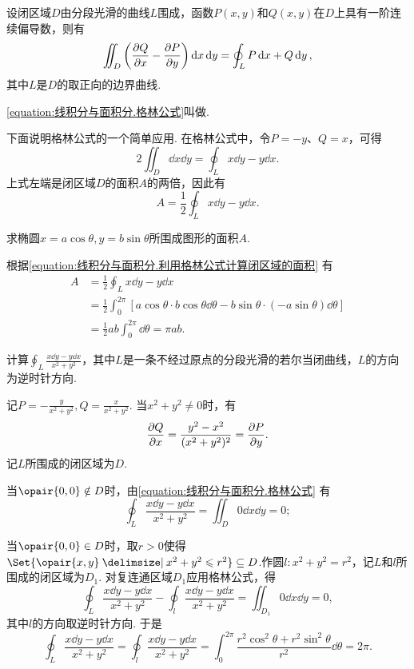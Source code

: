 \begin{theorem}[格林公式]
设闭区域\(D\)由分段光滑的曲线\(L\)围成，函数\(P(x,y)\)和\(Q(x,y)\)在\(D\)上具有一阶连续偏导数，则有
\begin{equation}\label{equation:线积分与面积分.格林公式}
\iint_D \left( \pdv{Q}{x} - \pdv{P}{y} \right) \dd{x}\dd{y}
= \oint_L P\dd{x} + Q\dd{y},
\end{equation}其中\(L\)是\(D\)的取正向的边界曲线.
\end{theorem}
\cref{equation:线积分与面积分.格林公式}叫做.

下面说明格林公式的一个简单应用.
在格林公式中，令\(P=-y\)、\(Q=x\)，可得\[
2 \iint_D \dd{x}\dd{y}
=\oint_L x\dd{y}-y\dd{x}.
\]上式左端是闭区域\(D\)的面积\(A\)的两倍，因此有
\begin{equation}\label{equation:线积分与面积分.利用格林公式计算闭区域的面积}
A = \frac{1}{2} \oint_L x\dd{y}-y\dd{x}.
\end{equation}
\begin{example}
求椭圆\(x = a \cos\theta, y = b \sin\theta\)所围成图形的面积\(A\).
\begin{solution}
根据\cref{equation:线积分与面积分.利用格林公式计算闭区域的面积} 有\begin{align*}
A &= \frac{1}{2} \oint_L x\dd{y}-y\dd{x} \\
&= \frac{1}{2} \int_0^{2\pi} \left[ a \cos\theta \cdot b \cos\theta \dd{\theta}
	- b \sin\theta \cdot (-a \sin\theta) \dd{\theta} \right] \\
&= \frac{1}{2} ab \int_0^{2\pi} \dd{\theta}
= \pi ab.
\end{align*}
\end{solution}
\end{example}

\begin{example}
计算\(\oint_L \frac{x\dd{y}-y\dd{x}}{x^2+y^2}\)，其中\(L\)是一条不经过原点的分段光滑的若尔当闭曲线，\(L\)的方向为逆时针方向.
\begin{solution}
记\(P = -\frac{y}{x^2+y^2}, Q = \frac{x}{x^2+y^2}\).
当\(x^2+y^2\neq0\)时，有\[
\pdv{Q}{x} = \frac{y^2-x^2}{(x^2+y^2)^2} = \pdv{P}{y}.
\]记\(L\)所围成的闭区域为\(D\).

当\(\opair{0,0} \notin D\)时，由\cref{equation:线积分与面积分.格林公式} 有\[
\oint_L \frac{x\dd{y}-y\dd{x}}{x^2+y^2} = \iint_D 0 \dd{x}\dd{y} = 0;
\]

当\(\opair{0,0} \in D\)时，取\(r>0\)使得\(\Set{ \opair{x,y} \given x^2+y^2 \leqslant r^2 } \subseteq D\).作圆\(l: x^2+y^2=r^2\)，记\(L\)和\(l\)所围成的闭区域为\(D_1\).
对复连通区域\(D_1\)应用格林公式，得\[
\oint_L \frac{x\dd{y}-y\dd{x}}{x^2+y^2} - \oint_l \frac{x\dd{y}-y\dd{x}}{x^2+y^2}
= \iint_{D_1} 0 \dd{x}\dd{y} = 0,
\]其中\(l\)的方向取逆时针方向.
于是\[
\oint_L \frac{x\dd{y}-y\dd{x}}{x^2+y^2}
= \oint_l \frac{x\dd{y}-y\dd{x}}{x^2+y^2}
= \int_0^{2\pi} \frac{r^2 \cos^2\theta + r^2 \sin^2\theta}{r^2} \dd{\theta}
= 2\pi.
\]
\end{solution}
\end{example}

